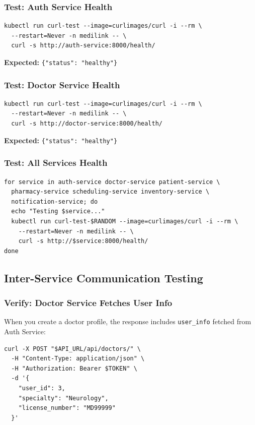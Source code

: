 \documentclass[12pt,a4paper]{article}
\begin{document}
\subsubsection{Test: Auth Service Health}
\begin{lstlisting}[style=bash]
kubectl run curl-test --image=curlimages/curl -i --rm \
  --restart=Never -n medilink -- \
  curl -s http://auth-service:8000/health/
\end{lstlisting}

\textbf{Expected:} \texttt{\{"status": "healthy"\}}

\subsubsection{Test: Doctor Service Health}
\begin{lstlisting}[style=bash]
kubectl run curl-test --image=curlimages/curl -i --rm \
  --restart=Never -n medilink -- \
  curl -s http://doctor-service:8000/health/
\end{lstlisting}

\textbf{Expected:} \texttt{\{"status": "healthy"\}}

\subsubsection{Test: All Services Health}
\begin{lstlisting}[style=bash]
for service in auth-service doctor-service patient-service \
  pharmacy-service scheduling-service inventory-service \
  notification-service; do
  echo "Testing $service..."
  kubectl run curl-test-$RANDOM --image=curlimages/curl -i --rm \
    --restart=Never -n medilink -- \
    curl -s http://$service:8000/health/
done
\end{lstlisting}

\subsection{Inter-Service Communication Testing}

\subsubsection{Verify: Doctor Service Fetches User Info}
When you create a doctor profile, the response includes \texttt{user\_info} fetched from Auth Service:

\begin{lstlisting}[style=bash]
curl -X POST "$API_URL/api/doctors/" \
  -H "Content-Type: application/json" \
  -H "Authorization: Bearer $TOKEN" \
  -d '{
    "user_id": 3,
    "specialty": "Neurology",
    "license_number": "MD99999"
  }'
\end{lstlisting}
\end{document}
